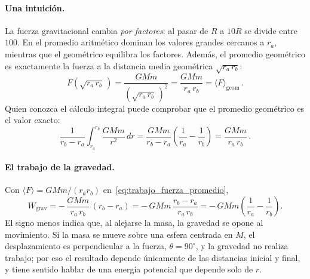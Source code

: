 \documentclass[11pt,a4paper]{book}
\begin{document}
\paragraph{Una intuición.}
La fuerza gravitacional cambia \emph{por factores}: al pasar de $R$ a $10R$ se
divide entre $100$. En el promedio aritmético dominan los valores grandes
cercanos a $r_{a}$, mientras que el geométrico equilibra los factores. Además,
el promedio geométrico es exactamente la fuerza a la distancia media
geométrica $\sqrt{r_{a}\,r_{b}}$:
\begin{equation}
  F\!\left(\sqrt{r_{a}\,r_{b}}\,\right)
  = \frac{GMm}{\left(\sqrt{r_{a}\,r_{b}}\,\right)^{2}}
  = \frac{GMm}{r_{a}\,r_{b}}
  = \langle F\rangle_{\text{geom}} \,.
  \label{eq:fuerza_media_geometrica}
\end{equation}
Quien conozca el cálculo integral puede comprobar que el promedio geométrico
es el valor exacto:
\begin{equation}
  \frac{1}{r_{b} - r_{a}} \int_{r_{a}}^{r_{b}} \frac{GMm}{r^{2}}\,dr
  = \frac{GMm}{r_{b} - r_{a}}\left(\frac{1}{r_{a}} - \frac{1}{r_{b}}\right)
  = \frac{GMm}{r_{a}\,r_{b}} \,.
  \label{eq:promedio_integral}
\end{equation}

\paragraph{El trabajo de la gravedad.}
Con $\langle F\rangle = GMm/(r_{a} r_{b})$
en~\eqref{eq:trabajo_fuerza_promedio},
\begin{equation}
  W_{\text{grav}}
  = -\,\frac{GMm}{r_{a}\,r_{b}}\,(r_{b} - r_{a})
  = -\,GMm\,\frac{r_{b} - r_{a}}{r_{a}\,r_{b}}
  = -\,GMm\left(\frac{1}{r_{a}} - \frac{1}{r_{b}}\right) .
  \label{eq:trabajo_grav_r1_r2}
\end{equation}
El signo menos indica que, al alejarse la masa, la gravedad se opone al
movimiento. Si la masa se mueve sobre una esfera centrada en $M$, el
desplazamiento es perpendicular a la fuerza, $\theta = 90^{\circ}$, y la
gravedad no realiza trabajo; por eso el resultado depende únicamente de las
distancias inicial y final, y tiene sentido hablar de una energía potencial
que depende solo de $r$.
\end{document}
